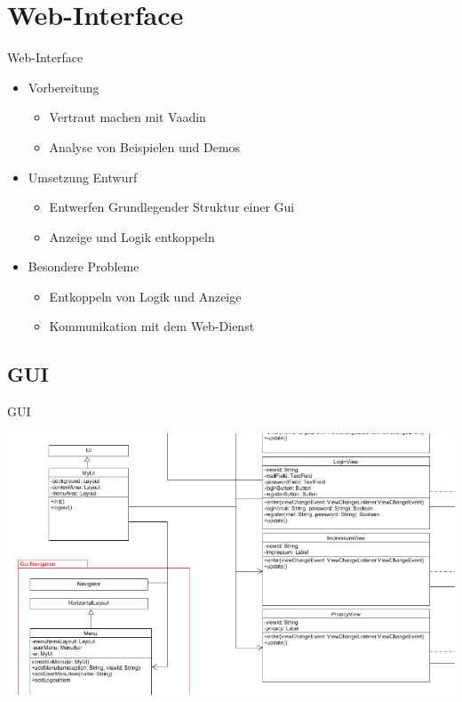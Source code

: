 \documentclass[19pt]{beamer}
\begin{document}
\section{Web-Interface}
\begin{frame}{Web-Interface}
    \begin{itemize}
    	\item Vorbereitung
    	\begin{itemize}
			\item Vertraut machen mit Vaadin
			\pause
			\item Analyse von Beispielen und Demos
			\pause
		\end{itemize}
		\item Umsetzung Entwurf
		\begin{itemize}
			\item Entwerfen Grundlegender Struktur einer Gui
			\pause
			\item Anzeige und Logik entkoppeln
			\pause
		\end{itemize}
    	\item Besondere Probleme
    	\begin{itemize}
			\item Entkoppeln von Logik und Anzeige
			\pause
			\item Kommunikation mit dem Web-Dienst
		\end{itemize}
    \end{itemize}
\end{frame}
\subsection{GUI}
\begin{frame}{GUI}
\begin{center}
\includegraphics[scale=0.35]{resources/interface_gui.png}
\end{center}
\end{frame}
\end{document}
